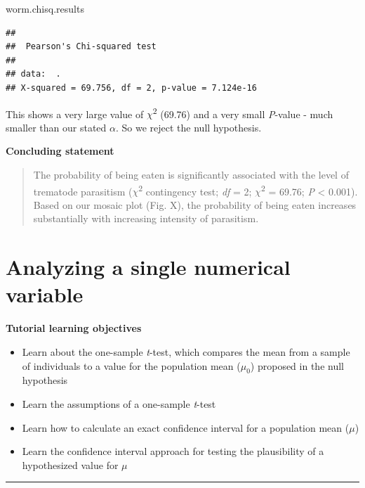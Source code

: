 \documentclass[
]{book}
\newenvironment{Shaded}{\begin{snugshade}}{\end{snugshade}}
\newcommand{\NormalTok}[1]{#1}
\providecommand{\tightlist}{%
  \setlength{\itemsep}{0pt}\setlength{\parskip}{0pt}}
\begin{document}
\begin{Shaded}
\begin{Highlighting}[]
\NormalTok{worm.chisq.results}
\end{Highlighting}
\end{Shaded}

\begin{verbatim}
## 
##  Pearson's Chi-squared test
## 
## data:  .
## X-squared = 69.756, df = 2, p-value = 7.124e-16
\end{verbatim}

This shows a very large value of \(\chi\)\textsuperscript{2} (69.76) and a very small \emph{P}-value - much smaller than our stated \(\alpha\). So we reject the null hypothesis.

\textbf{Concluding statement}

\begin{quote}
The probability of being eaten is significantly associated with the level of trematode parasitism (\(\chi\)\textsuperscript{2} contingency test; \emph{df} = 2; \(\chi\)\textsuperscript{2} = 69.76; \emph{P} \textless{} 0.001). Based on our mosaic plot (Fig. X), the probability of being eaten increases substantially with increasing intensity of parasitism.
\end{quote}

\chapter{Analyzing a single numerical variable}\label{single_numeric}

\textbf{Tutorial learning objectives}

\begin{itemize}
\tightlist
\item
  Learn about the one-sample \emph{t}-test, which compares the mean from a sample of individuals to a value for the population mean (\(\mu_0\)) proposed in the null hypothesis
\item
  Learn the assumptions of a one-sample \emph{t}-test
\item
  Learn how to calculate an exact confidence interval for a population mean (\(\mu\))
\item
  Learn the confidence interval approach for testing the plausibility of a hypothesized value for \(\mu\)
\end{itemize}

\begin{center}\rule{0.5\linewidth}{0.5pt}\end{center}
\end{document}
